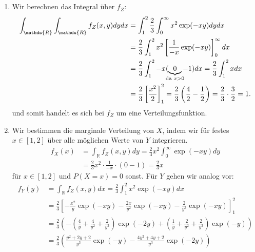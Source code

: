 \documentclass[a4paper]{article}
\begin{document}
\subsection{}

\begin{enumerate}
    \item Wir berechnen das Integral über $f_Z$:
    \begin{align*}
        \int_\mathds{R} \int_\mathds{R} f_Z(x,y) dy dx &= \int_1^2 \frac{2}{3} \int_{0}^{\infty}  x^2 \exp(-xy) dy dx\\
        &= \frac{2}{3} \int_{1}^{2} x^2 \left[ \frac{1}{-x} \exp(-xy) \right]_0^\infty dx\\
        &= \frac{2}{3} \int_{1}^{2} - x (\underbrace{0}_{\mathclap{\text{da }x>0}} - 1) dx = \frac{2}{3} \int_{1}^{2} x dx \\
        &= \frac{2}{3} \left[\frac{x^2}{2}\right]_1^2 = \frac{2}{3} \left(\frac{4}{2} - \frac{1}{2}\right) = \frac{2}{3} \cdot \frac{3}{2} = 1\text{.}
    \end{align*}
    und somit handelt es sich bei $f_Z$ um eine Verteilungsfunktion.
    \item Wir bestimmen die marginale Verteilung von $X$, indem wir für festes $x \in [1,2]$ über alle möglichen Werte von $Y$ integrieren.
    \begin{align*}
        f_X(x) &= \int_{\mathds{R}} f_Z(x,y) dy = \frac{2}{3} x^2 \int_{0}^{\infty} \exp(-xy) dy \\
        &= \frac{2}{3} x^2 \cdot \frac{1}{-x} \cdot (0-1) = \frac{2}{3} x
    \end{align*}
    für $x \in [1,2]$ und $P(X = x) = 0$ sonst. Für $Y$ gehen wir analog vor:
    \begin{align*}
        f_Y(y) &= \int_{\mathds{R}} f_Z(x,y) dx = \frac{2}{3} \int_{1}^{2} x^2 \exp(-xy) dx \\
        &= \frac{2}{3} \left[ -\frac{x^2}{y} \exp(-xy) - \frac{2x}{y^2} \exp(-xy) - \frac{2}{y^3} \exp(-xy)  \right]_1^2\\
        &= \frac{2}{3} \left( - \left(\frac{4}{y} + \frac{4}{y^2} + \frac{2}{y^3}  \right) \exp(-2y) + \left( \frac{1}{y} + \frac{2}{y^2} + \frac{2}{y^3} \right) \exp(-y) \right) \\
        &= \frac{2}{3} \left( \frac{y^2 + 2y + 2}{y^3} \exp(-y) - \frac{4y^2 + 4y + 2}{y^3} \exp(-2y) \right)
    \end{align*}
\end{enumerate}
\end{document}
